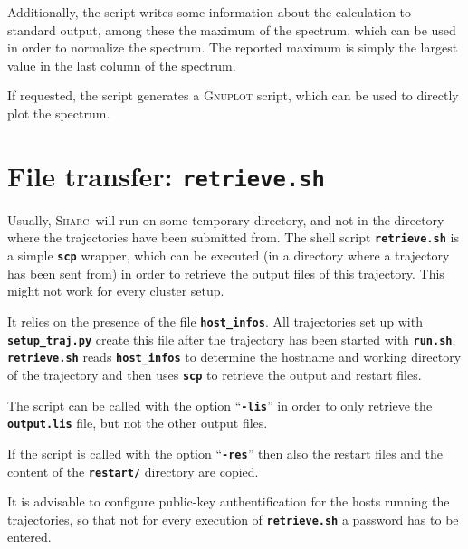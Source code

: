 \documentclass[a4paper,10pt,DIV=15,openany,twoside=false]{scrbook}
\newcommand{\sharc}{\textsc{Sharc}}
\newcommand{\ttt}[1]{\textbf{\texttt{#1}}}
\begin{document}
Additionally, the script writes some information about the calculation to standard output, among these the maximum of the spectrum, which can be used in order to normalize the spectrum. The reported maximum is simply the largest value in the last column of the spectrum. 

If requested, the script generates a \textsc{Gnuplot} script, which can be used to directly plot the spectrum. 






\section{File transfer: \ttt{retrieve.sh}}\label{sec:retrieve}

Usually, \sharc\ will run on some temporary directory, and not in the directory where the trajectories have been submitted from. The shell script \ttt{retrieve.sh} is a simple \ttt{scp} wrapper, which can be executed (in a directory where a trajectory has been sent from) in order to retrieve the output files of this trajectory. This might not work for every cluster setup.

It relies on the presence of the file \ttt{host\_infos}. All trajectories set up with \ttt{setup\_traj.py} create this file after the trajectory has been started with \ttt{run.sh}. \ttt{retrieve.sh} reads \ttt{host\_infos} to determine the hostname and working directory of the trajectory and then uses \ttt{scp} to retrieve the output and restart files.

The script can be called with the option ``\ttt{-lis}'' in order to only retrieve the \ttt{output.lis} file, but not the other output files.

If the script is called with the option ``\ttt{-res}'' then also the restart files and the content of the \ttt{restart/} directory are copied.

It is advisable to configure public-key authentification for the hosts running the trajectories, so that not for every execution of \ttt{retrieve.sh} a password has to be entered.










\end{document}
